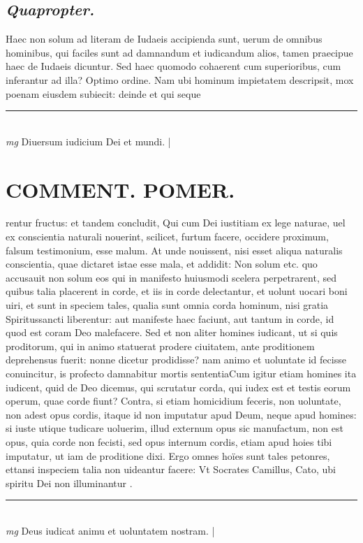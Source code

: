 \documentclass{article}
\begin{document}
\begin{pages}
\subsection*{\textit{Quapropter. }}\pstart Haec non solum ad literam de Iudaeis accipienda sunt, uerum de omnibus hominibus, qui faciles sunt ad damnandum et iudicandum alios, tamen praecipue haec de Iudaeis dicuntur. Sed haec quomodo cohaerent cum superioribus, cum inferantur ad illa? Optimo ordine. Nam ubi hominum impietatem descripsit, mox poenam eiusdem subiecit: deinde et qui seque\pend
\vspace{0.5cm}\noindent
\vspace{0.2cm}\rule{1cm}{0.2pt}\\ 
\hspace{0.2cm}\textit{mg}
\footnotesize Diuersum iudicium Dei et mundi. 
\normalsize| 
\section*{COMMENT. POMER.  }\pstart rentur fructus: et tandem concludit, Qui cum Dei iustitiam ex lege naturae, uel ex conscientia naturali nouerint, scilicet, furtum facere, occidere proximum, falsum testimonium, esse malum. At unde nouissent, nisi esset aliqua naturalis conscientia, quae dictaret istae esse mala, et addidit: Non solum etc. quo accusauit non solum eos qui in manifesto huiusmodi scelera perpetrarent, sed quibus talia placerent in corde, et iis in corde delectantur, et uolunt uocari boni uiri, et sunt in speciem tales, qualia sunt omnia corda hominum, nisi gratia Spiritussancti liberentur: aut manifeste haec faciunt, aut tantum in corde, id quod est coram Deo malefacere. Sed et non aliter homines iudicant, ut si quis proditorum, qui in animo statuerat prodere ciuitatem, ante proditionem deprehensus fuerit: nonne dicetur prodidisse? nam animo et uoluntate id fecisse conuincitur, is profecto damnabitur mortis sententiaCum igitur etiam homines ita iudicent, quid de Deo dicemus, qui scrutatur corda, qui iudex est et testis eorum operum, quae corde fiunt? Contra, si etiam homicidium feceris, non uoluntate, non adest opus cordis, itaque  id non imputatur apud Deum, neque apud homines: si iuste utique tudicare uoluerim, illud externum opus sic manufactum, non est opus, quia corde non fecisti, sed opus internum cordis, etiam apud hoies tibi imputatur, ut iam de proditione dixi. Ergo omnes hoïes sunt tales petonres, ettansi inspeciem talia non uideantur facere: Vt Socrates Camillus, Cato, ubi spiritu Dei non illuminantur .   \pend
\vspace{0.5cm}\noindent
\vspace{0.2cm}\rule{1cm}{0.2pt}\\ 
\hspace{0.2cm}\textit{mg}
\footnotesize Deus iudicat animu et uoluntatem nostram.  
\normalsize| 

\end{pages}
\end{document}
